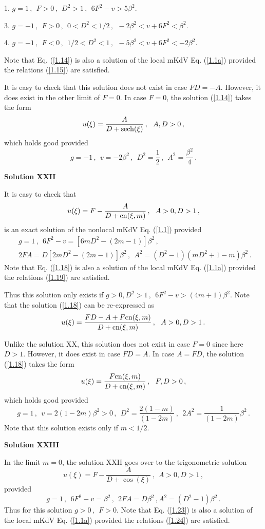 \documentclass[11pt]{article}
\newcommand{\be}{\begin{equation}}
\newcommand{\ee}{\end{equation}}
\newcommand{\bea}{\begin{eqnarray}}
\newcommand{\eea}{\end{eqnarray}}
\newcommand{\cn}{{\rm cn}}
\newcommand{\sech}{{\rm sech}}
\begin{document}
1. $g = 1\,,~~F > 0\,,~~D^2 > 1\,,~~6 F^2 -v > 5\beta^2$.

3. $g = -1\,,~~F > 0\,,~~0 < D^2 < 1/2\,,~~-2\beta^2 < v+6F^2 < \beta^2$.

4. $g = -1\,,~~F < 0\,,~~1/2 < D^2 < 1\,,~~-5\beta^2 < v+6F^2 < -2\beta^2$.

Note that Eq. (\ref{1.14}) is also a solution of the local mKdV 
Eq. (\ref{1.1a}) provided the relations (\ref{1.15}) are satisfied.

It is easy to check that this solution does not exist in case 
$FD = -A$. However, it does exist in the other limit of $F =0$.
In case $F =0$, the solution (\ref{1.14}) takes the form
\be\label{1.16}
u(\xi) = \frac{A}{D+\sech(\xi)}\,,~~A, D > 0\,,
\ee
which holds good provided
\be\label{1.17}
g = -1\,,~~v = -2\beta^2\,,~~D^2 = \frac{1}{2}\,,~~
A^2 = \frac{\beta^2}{4}\,.
\ee

{\bf Solution XXII}

It is easy to check that
\be\label{1.18}
u(\xi) = F - \frac{A}{D+\cn(\xi,m)}\,,~~A > 0, D > 1\,,
\ee
is an exact solution of the nonlocal mKdV Eq. (\ref{1.1}) provided
\bea\label{1.19}
&&g = 1\,,~~6F^2-v = [6m D^2-(2m-1)]\beta^2\,, \nonumber \\
&&2FA =D[2m D^2-(2m-1)]\beta^2\,,~~A^2 = (D^2-1)(m D^2+1-m) \beta^2\,. ~~~~~~~
\eea
Note that Eq. (\ref{1.18}) is also a solution of the local mKdV 
Eq. (\ref{1.1a}) provided the relations (\ref{1.19}) are satisfied.

Thus this solution only exists if $g > 0, D^2 > 1\,,~~6F^2-v > (4m+1) \beta^2$.
Note that the solution (\ref{1.18}) can be re-expressed as
\be\label{1.20}
u(\xi) = \frac{FD-A+F\cn(\xi,m)}{D+\cn(\xi,m)}\,,~~A > 0, D > 1\,.
\ee

Unlike the solution XX, this solution does not exist in case $F = 0$ since
here $D > 1$. However, it does exist in case $FD = A$.
In case $A = FD$, the solution (\ref{1.18}) takes the form
\be\label{1.21}
u(\xi) = \frac{F\cn(\xi,m)}{D+\cn(\xi,m)}\,,~~F, D > 0\,,
\ee
which holds good provided
\be\label{1.22}
g = 1\,,~~v = 2(1-2m)\beta^2 > 0\,,~~D^2 = \frac{2(1-m)}{(1-2m)}\,,~~
2 A^2 = \frac{1}{(1-2m)} \beta^2\,.
\ee
Note that this solution exists only if $m < 1/2$. 

{\bf Solution XXIII}

In the limit $m = 0$, the solution  XXII goes over
to the trigonometric solution
\be\label{1.23}
u(\xi) = F - \frac{A}{D+\cos(\xi)}\,,~~A > 0, D > 1\,,
\ee
provided
\be\label{1.24}
g = 1\,,~~6F^2-v = \beta^2\,,~~2FA =D \beta^2\,,
A^2 = (D^2-1) \beta^2\,.
\ee
Thus for this solution $g > 0\,,~~F > 0$.
Note that Eq. (\ref{1.23}) is also a solution of the local mKdV 
Eq. (\ref{1.1a}) provided the relations (\ref{1.24}) are satisfied.
\end{document}
